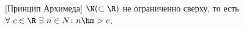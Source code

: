 [Принцип Архимеда] \label{arhy}
$\N(\subset \R)$ не ограниченно сверху, то есть $\forall\  c\in \R\ \exists\  n\in N\colon n\hm>c$.
